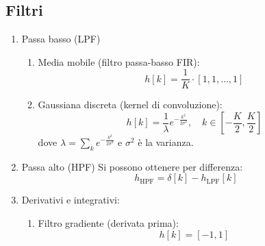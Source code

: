 \subsection{Filtri}
\begin{enumerate}
	\item Passa basso (LPF)
	      \begin{enumerate}
		      \item Media mobile (filtro passa-basso FIR):
		            \[
			            h[k] = \frac{1}{K} \cdot [1, 1, \dots, 1]
		            \]

		      \item Gaussiana discreta (kernel di convoluzione):
		            \[
			            h[k] = \frac{1}{\lambda} e^{-\frac{k^2}{2\sigma^2}}, \quad k \in \left[-\frac{K}{2}, \frac{K}{2}\right]
		            \]
		            dove $\lambda  = \sum_{k} e^{- \frac{k^2 }{2 \sigma  ^2 }}$ e $ \sigma ^2  $ è la varianza.
	      \end{enumerate}
	\item Passa alto (HPF)
	      Si possono ottenere per differenza:
	      \[
		      h_{\text{HPF}} = \delta \left[k\right] - h_{\text{LPF}}\left[k\right]
	      \]
	\item Derivativi e integrativi:
	      \begin{enumerate}
		      \item Filtro gradiente (derivata prima):
		            \[
			            h[k] = [-1, 1]
		            \]


\end{enumerate}
\end{enumerate}

